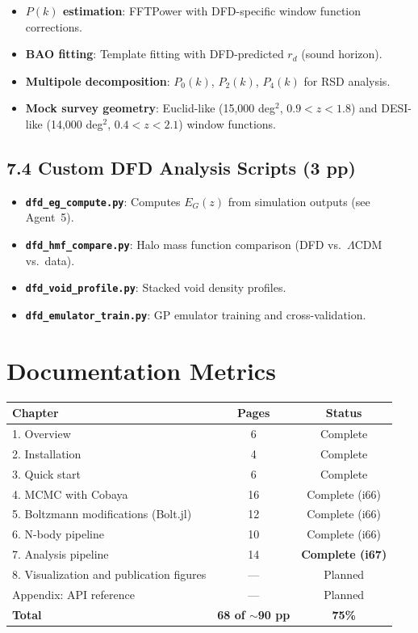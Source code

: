\documentclass[11pt,a4paper]{article}
\begin{document}
\begin{itemize}
\item \textbf{$P(k)$ estimation}: FFTPower with DFD-specific window function corrections.
\item \textbf{BAO fitting}: Template fitting with DFD-predicted $r_d$ (sound horizon).
\item \textbf{Multipole decomposition}: $P_0(k)$, $P_2(k)$, $P_4(k)$ for RSD analysis.
\item \textbf{Mock survey geometry}: Euclid-like (15,000 deg$^2$, $0.9 < z < 1.8$) and DESI-like (14,000 deg$^2$, $0.4 < z < 2.1$) window functions.
\end{itemize}

\subsection{7.4 Custom DFD Analysis Scripts (3 pp)}

\begin{itemize}
\item \textbf{\texttt{dfd\_eg\_compute.py}}: Computes $E_G(z)$ from simulation outputs (see Agent~5).
\item \textbf{\texttt{dfd\_hmf\_compare.py}}: Halo mass function comparison (DFD vs.\ $\Lambda$CDM vs.\ data).
\item \textbf{\texttt{dfd\_void\_profile.py}}: Stacked void density profiles.
\item \textbf{\texttt{dfd\_emulator\_train.py}}: GP emulator training and cross-validation.
\end{itemize}

\section{Documentation Metrics}

\begin{center}
\begin{tabular}{lcc}
\toprule
\textbf{Chapter} & \textbf{Pages} & \textbf{Status} \\
\midrule
1. Overview & 6 & Complete \\
2. Installation & 4 & Complete \\
3. Quick start & 6 & Complete \\
4. MCMC with Cobaya & 16 & Complete (i66) \\
5. Boltzmann modifications (Bolt.jl) & 12 & Complete (i66) \\
6. N-body pipeline & 10 & Complete (i66) \\
7. Analysis pipeline & 14 & \textbf{Complete (i67)} \\
8. Visualization and publication figures & --- & Planned \\
Appendix: API reference & --- & Planned \\
\midrule
\textbf{Total} & \textbf{68 of $\sim$90 pp} & \textbf{75\%} \\
\bottomrule
\end{tabular}
\end{center}
\end{document}
